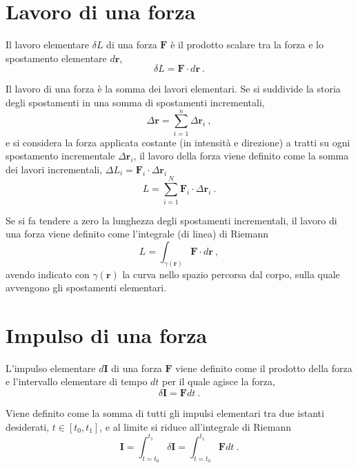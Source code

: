 \section{Lavoro di una forza}
\begin{definition} Il lavoro elementare $\delta L$ di una forza $\mathbf{F}$ è il prodotto scalare tra la forza e lo spostamento elementare $d \mathbf{r}$,
    \begin{equation}
        \delta L = \mathbf{F} \cdot d \mathbf{r} \ .
    \end{equation}
\end{definition}
Il lavoro di una forza è la somma dei lavori elementari. Se si suddivide la storia degli spostamenti in una somma di spostamenti incrementali,
\begin{equation}
  \Delta \mathbf{r} = \sum_{i=1}^{n} \Delta \mathbf{r}_i \ ,
\end{equation}
e si considera la forza applicata costante (in intensità e direzione) a tratti su ogni spostamento incrementale $\Delta \mathbf{r}_i$, il lavoro della forza viene definito come la somma dei lavori incrementali, $\Delta L_i = \mathbf{F}_i \cdot \Delta \mathbf{r}_i$
\begin{equation}
  L = \sum_{i=1}^{N} \mathbf{F}_i \cdot \Delta \mathbf{r}_i \ .
\end{equation}
\begin{definition}
Se si fa tendere a zero la lunghezza degli spostamenti incrementali, il lavoro di una forza viene definito come l'integrale (di linea) di Riemann
\begin{equation}
    L = \int_{\gamma(\mathbf{r})} \mathbf{F} \cdot d \mathbf{r} \ ,
\end{equation}
avendo indicato con $\gamma(\mathbf{r})$ la curva nello spazio percorsa dal corpo, sulla quale avvengono gli spostamenti elementari.
\end{definition}

\section{Impulso di una forza}
\begin{definition}
    L'impulso elementare $d \mathbf{I}$ di una forza $\mathbf{F}$ viene definito come il prodotto della forza e l'intervallo elementare di tempo $dt$ per il quale agisce la forza,
    \begin{equation}
        \delta \mathbf{I} = \mathbf{F} dt \ .
    \end{equation}
\end{definition}
\begin{definition} Viene definito come la somma di tutti gli impulsi elementari tra due istanti desiderati,  $t \in [t_0, t_1]$, e al limite si riduce all'integrale di Riemann
    \begin{equation}
        \mathbf{I} = \int_{t=t_0}^{t_1} \delta \mathbf{I} = \int_{t=t_0}^{t_1} \mathbf{F} dt \ .
    \end{equation}
\end{definition}

